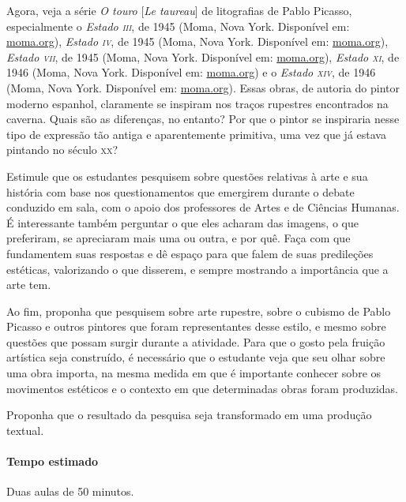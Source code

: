 \documentclass[12pt]{extarticle}
\begin{document}
Agora, veja a série \emph{O touro} {[\emph{Le taureau}]} de
  litografias de Pablo Picasso, especialmente o \emph{Estado \textsc{iii}}, de
  1945 (Moma, Nova York. Disponível em:
  \href{https://www.moma.org/collection/works/62951}{moma.org}), \emph{Estado \textsc{iv}}, de 1945 (Moma,
  Nova York. Disponível em:
  \href{https://www.moma.org/collection/works/62968}{moma.org}), \emph{Estado \textsc{vii}}, de 1945 (Moma,
  Nova York. Disponível em:
  \href{https://www.moma.org/collection/works/62986}{moma.org}), \emph{Estado \textsc{xi}}, de 1946 (Moma,
  Nova York. Disponível em:
  \href{https://www.moma.org/collection/works/63046}{moma.org}) e o \emph{Estado \textsc{xiv}}, de 1946
  (Moma, Nova York. Disponível em:
  \href{https://www.moma.org/collection/works/65356}{moma.org}). Essas obras, de autoria do pintor
  moderno espanhol, claramente se inspiram nos traços rupestres
  encontrados na caverna. Quais são as diferenças, no entanto? Por que o
  pintor se inspiraria nesse tipo de expressão tão antiga e
  aparentemente primitiva, uma vez que já estava pintando no século \textsc{xx}?

  Estimule que os estudantes pesquisem sobre questões relativas à arte e
  sua história com base nos questionamentos que emergirem durante o
  debate conduzido em sala, com o apoio dos professores de Artes e de Ciências Humanas. É interessante também perguntar o que eles
  acharam das imagens, o que preferiram, se apreciaram mais uma ou
  outra, e por quê. Faça com que fundamentem suas respostas e dê espaço
  para que falem de suas predileções estéticas, valorizando o que
  disserem, e sempre mostrando a importância que a arte tem.

  Ao fim, proponha que pesquisem sobre arte rupestre, sobre o cubismo de
  Pablo Picasso e outros pintores que foram representantes desse estilo,
  e mesmo sobre questões que possam surgir durante a atividade. Para que
  o gosto pela fruição artística seja construído, é necessário que o
  estudante veja que seu olhar sobre uma obra importa, na mesma medida
  em que é importante conhecer sobre os movimentos estéticos e o
  contexto em que determinadas obras foram produzidas.

  Proponha que o resultado da pesquisa seja transformado em uma produção
  textual.

\paragraph{Tempo estimado} Duas aulas de 50 minutos.
\end{document}
